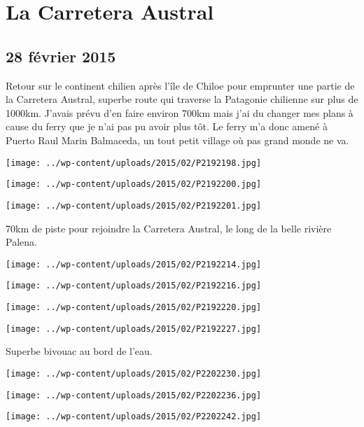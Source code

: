 \chapter{La Carretera Austral}
\section*{28 février 2015}
Retour sur le continent chilien après l'île de Chiloe pour emprunter une partie de la Carretera Austral, superbe route qui traverse la Patagonie chilienne sur plus de 1000km. \newline
 J'avais prévu d'en faire environ 700km mais j'ai du changer mes plans à cause du ferry que je n'ai pas pu avoir plus tôt. \newline
 Le ferry m'a donc amené à Puerto Raul Marin Balmaceda, un tout petit village où pas grand monde ne va. \newline
 \newline
\centerline{\texttt{[image: ../wp-content/uploads/2015/02/P2192198.jpg]} } 
\newline
\centerline{\texttt{[image: ../wp-content/uploads/2015/02/P2192200.jpg]} } 
 \newline
\centerline{\texttt{[image: ../wp-content/uploads/2015/02/P2192201.jpg]} } 
70km de piste pour rejoindre la Carretera Austral, le long de la belle rivière Palena. \newline
 \newline
\centerline{\texttt{[image: ../wp-content/uploads/2015/02/P2192214.jpg]} } 
 \newline
\centerline{\texttt{[image: ../wp-content/uploads/2015/02/P2192216.jpg]} } 
 \newline
\centerline{\texttt{[image: ../wp-content/uploads/2015/02/P2192220.jpg]} } 
 \newline
\centerline{\texttt{[image: ../wp-content/uploads/2015/02/P2192227.jpg]} } 
 \newline
 Superbe bivouac au bord de l'eau.\newline
\centerline{\texttt{[image: ../wp-content/uploads/2015/02/P2202230.jpg]} } 
 \newline
 \newline
\centerline{\texttt{[image: ../wp-content/uploads/2015/02/P2202236.jpg]} } 
 \newline
\centerline{\texttt{[image: ../wp-content/uploads/2015/02/P2202242.jpg]} } 
\newline
